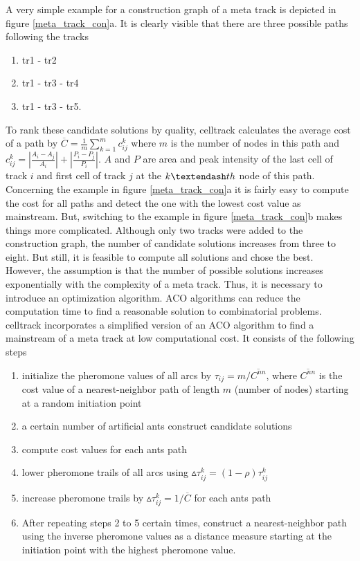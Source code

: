 \documentclass{scrartcl}
\begin{document}
A very simple example for a construction graph of a meta track is depicted in figure \ref{meta_track_con}a. It is clearly visible that there are three possible paths following the tracks
\begin{enumerate}
	\item tr1 - tr2
	\item tr1 - tr3 - tr4	
	\item tr1 - tr3 - tr5.
\end{enumerate}
To rank these candidate solutions by quality, celltrack calculates the average cost of a path by $\overline{C}=\frac{1}{m}\sum_{k=1}^{m}{c_{ij}^k}$ where $m$ is the number of nodes in this path and $c_{ij}^k=|\frac{A_i-A_j}{A_i}| + |\frac{P_i-P_j}{P_i}|$. $A$ and $P$ are area and peak intensity of the last cell of track $i$ and first cell of track $j$ at the $k\textendash th$ node of this path. Concerning the example in figure \ref{meta_track_con}a it is fairly easy to compute the cost for all paths and detect the one with the lowest cost value as mainstream. But, switching to the example in figure \ref{meta_track_con}b makes things more complicated. Although only two tracks were added to the construction graph, the number of candidate solutions increases from three to eight. But still, it is feasible to compute all solutions and chose the best. However, the assumption is that the number of possible solutions increases exponentially with the complexity of a meta track. Thus, it is necessary to introduce an optimization algorithm. ACO algorithms can reduce the computation time to find a reasonable solution to combinatorial problems. celltrack incorporates a simplified version of an ACO algorithm \citep{DorSta2004:book} to find a mainstream of a meta track at low computational cost. It consists of the following steps
\begin{enumerate}
	\item initialize the pheromone values of all arcs by $\tau_{ij}=m/\overline{C^{nn}}$, where $\overline{C^{nn}}$ is the cost value of a nearest-neighbor path of length $m$ (number of nodes) starting at a random initiation point
	\item a certain number of artificial ants construct candidate solutions
	\item compute cost values for each ants path
	\item lower pheromone trails of all arcs using $\vartriangle \tau_{ij}^{k}=(1-\rho)\tau_{ij}^{k}$
	\item increase pheromone trails by $\vartriangle \tau_{ij}^k=1/\overline{C}$ for each ants path
	\item After repeating steps 2 to 5 certain times, construct a nearest-neighbor path using the inverse pheromone values as a distance measure starting at the initiation point with the highest pheromone value.
\end{enumerate}
\end{document}
